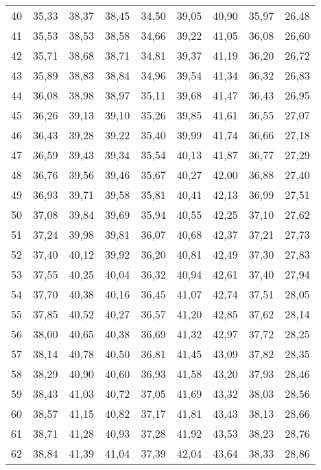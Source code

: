 \begin{longtable}{c c c c c c c c c}
      40	& 35,33	& 38,37	& 38,45	& 34,50	& 39,05	& 40,90	& 35,97	& 26,48 \\
      41	& 35,53	& 38,53	& 38,58	& 34,66	& 39,22	& 41,05	& 36,08	& 26,60 \\
      42	& 35,71	& 38,68	& 38,71	& 34,81	& 39,37	& 41,19	& 36,20	& 26,72 \\
      43	& 35,89	& 38,83	& 38,84	& 34,96	& 39,54	& 41,34	& 36,32	& 26,83 \\
      44	& 36,08	& 38,98	& 38,97	& 35,11	& 39,68	& 41,47	& 36,43	& 26,95 \\
      45	& 36,26	& 39,13	& 39,10	& 35,26	& 39,85	& 41,61	& 36,55	& 27,07 \\
      46	& 36,43	& 39,28	& 39,22	& 35,40	& 39,99	& 41,74	& 36,66	& 27,18 \\
      47	& 36,59	& 39,43	& 39,34	& 35,54	& 40,13	& 41,87	& 36,77	& 27,29 \\
      48	& 36,76	& 39,56	& 39,46	& 35,67	& 40,27	& 42,00	& 36,88	& 27,40 \\
      49	& 36,93	& 39,71	& 39,58	& 35,81	& 40,41	& 42,13	& 36,99	& 27,51 \\
      50	& 37,08	& 39,84	& 39,69	& 35,94	& 40,55	& 42,25	& 37,10	& 27,62 \\
      51	& 37,24	& 39,98	& 39,81	& 36,07	& 40,68	& 42,37	& 37,21	& 27,73 \\
      52	& 37,40	& 40,12	& 39,92	& 36,20	& 40,81	& 42,49	& 37,30	& 27,83 \\
      53	& 37,55	& 40,25	& 40,04	& 36,32	& 40,94	& 42,61	& 37,40	& 27,94 \\
      54	& 37,70	& 40,38	& 40,16	& 36,45	& 41,07	& 42,74	& 37,51	& 28,05 \\
      55	& 37,85	& 40,52	& 40,27	& 36,57	& 41,20	& 42,85	& 37,62	& 28,14 \\
      56	& 38,00	& 40,65	& 40,38	& 36,69	& 41,32	& 42,97	& 37,72	& 28,25 \\
      57	& 38,14	& 40,78	& 40,50	& 36,81	& 41,45	& 43,09	& 37,82	& 28,35 \\
      58	& 38,29	& 40,90	& 40,60	& 36,93	& 41,58	& 43,20	& 37,93	& 28,46 \\
      59	& 38,43	& 41,03	& 40,72	& 37,05	& 41,69	& 43,32	& 38,03	& 28,56 \\
      60	& 38,57	& 41,15	& 40,82	& 37,17	& 41,81	& 43,43	& 38,13	& 28,66 \\
      61	& 38,71	& 41,28	& 40,93	& 37,28	& 41,92	& 43,53	& 38,23	& 28,76 \\
      62	& 38,84	& 41,39	& 41,04	& 37,39	& 42,04	& 43,64	& 38,33	& 28,86 \\

\end{longtable}
